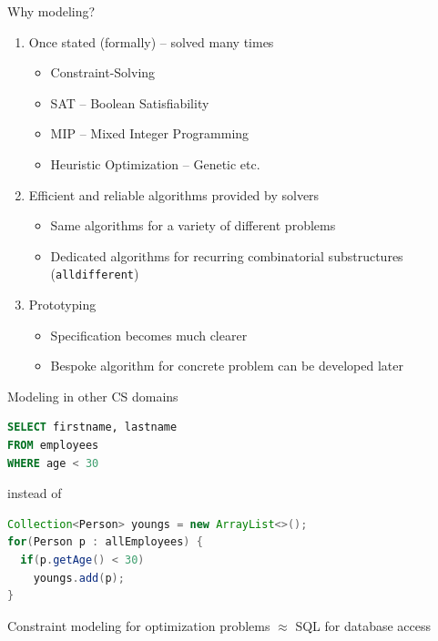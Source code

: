 \begin{frame}{Why modeling?}
\begin{enumerate}
\item Once stated (formally) -- solved many times
\begin{itemize}
\item Constraint-Solving
\item SAT -- Boolean Satisfiability
\item MIP -- Mixed Integer Programming
\item Heuristic Optimization -- Genetic etc. 
\end{itemize}
\vspace*{1ex}
\item Efficient and reliable algorithms provided by solvers
\begin{itemize}
\item Same algorithms for a variety of different problems
\item Dedicated algorithms for recurring combinatorial substructures (\texttt{alldifferent})
\end{itemize}
\vspace*{1ex}
\item Prototyping
\begin{itemize}
\item Specification becomes much clearer 
\item Bespoke algorithm for concrete problem can be developed later 
\end{itemize}

\end{enumerate}
\end{frame}

\begin{frame}[fragile]{Modeling in other CS domains}
\begin{lstlisting}[language=sql]
SELECT firstname, lastname
FROM employees 
WHERE age < 30
\end{lstlisting}
\vspace*{1ex}
instead of 
\vspace*{1ex}
\begin{lstlisting}[language=java]
Collection<Person> youngs = new ArrayList<>();
for(Person p : allEmployees) {
  if(p.getAge() < 30)
    youngs.add(p);
}
\end{lstlisting}

\begin{parchment}[Motivation]
\centering 
\alert{Constraint modeling for optimization problems $\approx$ SQL for database access} 
\end{parchment}

\end{frame}

